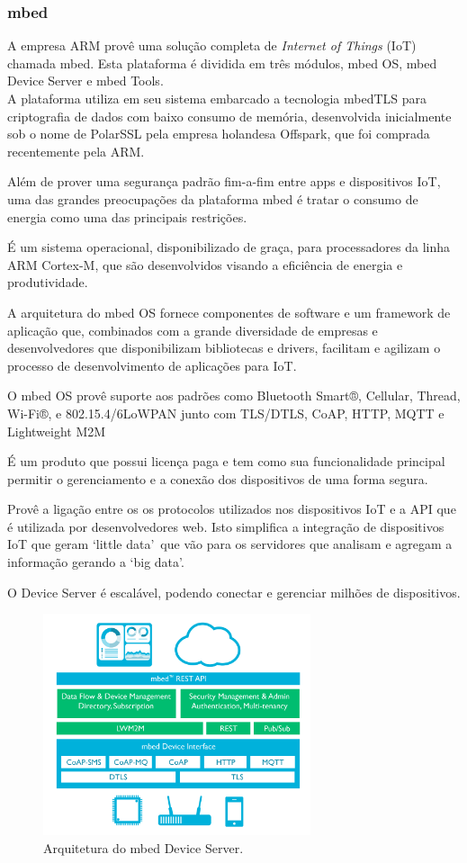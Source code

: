 \subsubsection{mbed}
A empresa ARM provê uma solução completa de \textit{Internet of Things} (IoT) chamada mbed\cite{mbed}.
Esta plataforma é dividida em três módulos, mbed OS, mbed Device Server e mbed Tools.\\
A plataforma utiliza em seu sistema embarcado a tecnologia mbedTLS para criptografia de dados com baixo
consumo de memória, desenvolvida inicialmente sob o nome de PolarSSL pela empresa holandesa Offspark,
que foi comprada recentemente pela ARM.

Além de prover uma segurança padrão fim-a-fim entre apps e dispositivos IoT, uma das grandes preocupações
da plataforma mbed é tratar o consumo de energia como uma das principais restrições.

É um sistema operacional, disponibilizado de graça, para processadores da linha ARM Cortex-M, que são
desenvolvidos visando a eficiência de energia e produtividade.

A arquitetura do mbed OS fornece componentes de software e um framework de aplicação que, combinados
com a grande diversidade de empresas e desenvolvedores que disponibilizam bibliotecas e drivers, facilitam
e agilizam o processo de desenvolvimento de aplicações para IoT.

O mbed OS provê suporte aos padrões como Bluetooth Smart®, Cellular, Thread, Wi-Fi®, e 802.15.4/6LoWPAN junto
com TLS/DTLS, CoAP, HTTP, MQTT e Lightweight M2M

É um produto que possui licença paga e tem como sua funcionalidade principal permitir o gerenciamento
e a conexão dos dispositivos de uma forma segura.

Provê a ligação entre os os protocolos utilizados nos dispositivos IoT e a API que é utilizada por
desenvolvedores web. Isto simplifica a integração de dispositivos IoT que geram \lq little data\rq\ que vão
para os servidores que analisam e agregam a informação gerando a \lq big data\rq.

O Device Server é escalável, podendo conectar e gerenciar milhões de dispositivos.
\begin{figure}[H]
	\centering
		\includegraphics[width=0.7\textwidth]{fig/mbed_arch.png}
	\caption{Arquitetura do mbed Device Server.}
\end{figure}

